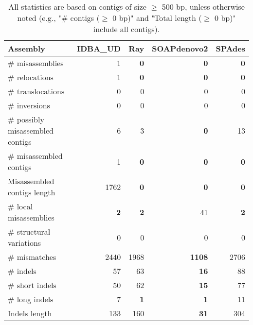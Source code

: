 \documentclass[12pt,a4paper]{article}
\begin{document}
\begin{table}[ht]
\begin{center}
\caption{All statistics are based on contigs of size $\geq$ 500 bp, unless otherwise noted (e.g., "\# contigs ($\geq$ 0 bp)" and "Total length ($\geq$ 0 bp)" include all contigs).}
\begin{tabular}{|l*{4}{|r}|}
\hline
Assembly & IDBA\_UD & Ray & SOAPdenovo2 & SPAdes \\ \hline
\# misassemblies & 1 & {\bf 0} & {\bf 0} & {\bf 0} \\ \hline
\hspace{5mm}\# relocations & 1 & {\bf 0} & {\bf 0} & {\bf 0} \\ \hline
\hspace{5mm}\# translocations & 0 & 0 & 0 & 0 \\ \hline
\hspace{5mm}\# inversions & 0 & 0 & 0 & 0 \\ \hline
\# possibly misassembled contigs & 6 & 3 & {\bf 0} & 13 \\ \hline
\# misassembled contigs & 1 & {\bf 0} & {\bf 0} & {\bf 0} \\ \hline
Misassembled contigs length & 1762 & {\bf 0} & {\bf 0} & {\bf 0} \\ \hline
\# local misassemblies & {\bf 2} & {\bf 2} & 41 & {\bf 2} \\ \hline
\# structural variations & 0 & 0 & 0 & 0 \\ \hline
\# mismatches & 2440 & 1968 & {\bf 1108} & 2706 \\ \hline
\# indels & 57 & 63 & {\bf 16} & 88 \\ \hline
\hspace{5mm}\# short indels & 50 & 62 & {\bf 15} & 77 \\ \hline
\hspace{5mm}\# long indels & 7 & {\bf 1} & {\bf 1} & 11 \\ \hline
Indels length & 133 & 160 & {\bf 31} & 304 \\ \hline
\end{tabular}
\end{center}
\end{table}
\end{document}
